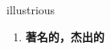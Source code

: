 
\begin{frame}
{\huge illustrious}
\begin{center}
\begin{enumerate}\Large
  \item \textbf{著名的，杰出的}
\end{enumerate}
\end{center}
\end{frame}
